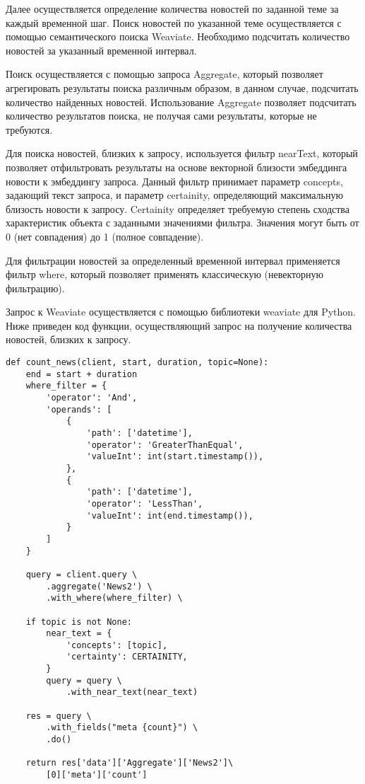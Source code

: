 Далее осуществляется определение количества новостей по заданной теме за каждый временной шаг. Поиск новостей по указанной теме осуществляется с помощью семантического поиска Weaviate. Необходимо подсчитать количество новостей за указанный временной интервал.

Поиск осуществляется с помощью запроса Aggregate, который позволяет агрегировать результаты поиска различным образом, в данном случае, подсчитать количество найденных новостей. Использование Aggregate позволяет подсчитать количество результатов поиска, не получая сами результаты, которые не требуются.

Для поиска новостей, близких к запросу, используется фильтр nearText, который позволяет отфильтровать результаты на основе векторной близости эмбеддинга новости к эмбеддингу запроса. Данный фильтр принимает параметр concepts, задающий текст запроса, и параметр certainity, определяющий максимальную близость новости к запросу. Certainity определяет требуемую степень сходства характеристик объекта с заданными значениями фильтра. Значения могут быть от 0 (нет совпадения) до 1 (полное совпадение).

Для фильтрации новостей за определенный временной интервал применяется фильтр where, который позволяет применять классическую (невекторную фильтрацию).

Запрос к Weaviate осуществляется с помощью библиотеки weaviate для Python. Ниже приведен код функции, осуществляющий запрос на получение количества новостей, близких к запросу.

\begin{lstlisting}
def count_news(client, start, duration, topic=None):
    end = start + duration
    where_filter = {
        'operator': 'And',
        'operands': [
            {
                'path': ['datetime'],
                'operator': 'GreaterThanEqual',
                'valueInt': int(start.timestamp()),
            },
            {
                'path': ['datetime'],
                'operator': 'LessThan',
                'valueInt': int(end.timestamp()),
            }
        ]
    }

    query = client.query \
        .aggregate('News2') \
        .with_where(where_filter) \

    if topic is not None:
        near_text = {
            'concepts': [topic],
            'certainty': CERTAINITY,
        }
        query = query \
            .with_near_text(near_text)

    res = query \
        .with_fields("meta {count}") \
        .do()

    return res['data']['Aggregate']['News2']\
        [0]['meta']['count']
\end{lstlisting}

